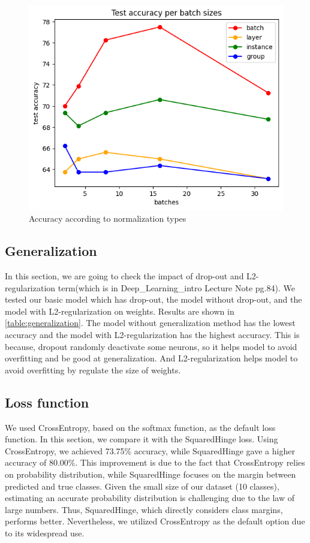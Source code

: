 \begin{figure}
	\centering
	\includegraphics[width=0.4\linewidth]{image/q4-3.png}
	\caption{Accuracy according to normalization types}
	\label{fig:normalization}
\end{figure}

\subsection{Generalization}
In this section, we are going to check the impact of drop-out and L2-regularization term(which is in Deep\_Learning\_intro Lecture Note pg.84). We tested our basic model which has drop-out, the model without drop-out, and the model with L2-regularization on weights. Results are shown in \cref{table:generalization}. The model without generalization method has the lowest accuracy and the model with L2-regularization has the highest accuracy. This is because, dropout randomly deactivate some neurons, so it helps model to avoid overfitting and be good at generalization. And L2-regularization helps model to avoid overfitting by regulate the size of weights.

\begin{table}
	\centering
	\setlength{\tabcolsep}{6pt}
	\renewcommand{\arraystretch}{1.5}
    \caption{Impact of generalization}
	\label{table:generalization}
\end{table}
	

\subsection{Loss function}
We used CrossEntropy, based on the softmax function, as the default loss function. In this section, we compare it with the SquaredHinge loss. Using CrossEntropy, we achieved 73.75\% accuracy, while SquaredHinge gave a higher accuracy of 80.00\%. This improvement is due to the fact that CrossEntropy relies on probability distribution, while SquaredHinge focuses on the margin between predicted and true classes. Given the small size of our dataset (10 classes), estimating an accurate probability distribution is challenging due to the law of large numbers. Thus, SquaredHinge, which directly considers class margins, performs better. Nevertheless, we utilized CrossEntropy as the default option due to its widespread use.


